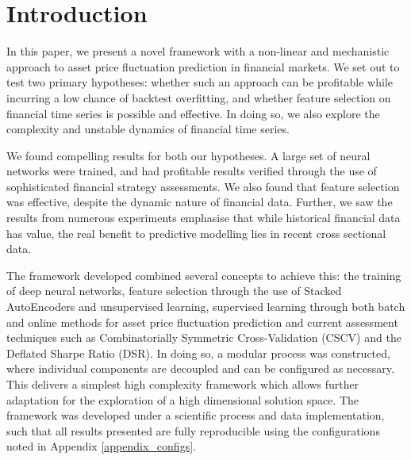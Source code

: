 \documentclass[a4paper,11pt,oneside]{article}
\theoremstyle{plain}
\theoremstyle{definition}
\begin{document}
	\newpage
	
	
	\section{Introduction}\label{Introduction}
	
	
	In this paper, we present a novel framework with a non-linear and mechanistic approach to asset price fluctuation prediction in financial markets. We set out to test two primary hypotheses: whether such an approach can be profitable while incurring a low chance of backtest overfitting, and whether feature selection on financial time series is possible and effective. In doing so, we also explore the complexity and unstable dynamics of financial time series.\newline
	
	We found compelling results for both our hypotheses. A large set of neural networks were trained, and had profitable results verified through the use of sophisticated financial strategy assessments. We also found  that feature selection was effective, despite the dynamic nature of financial data. Further, we saw the results from numerous experiments emphasise that while historical financial data has value, the real benefit to predictive modelling lies in recent cross sectional data.\newline

	The framework developed combined several concepts to achieve this: the training of deep neural networks, feature selection through the use of Stacked AutoEncoders and unsupervised learning, supervised learning through both batch and online methods for asset price fluctuation prediction and current assessment techniques such as Combinatorially Symmetric Cross-Validation (CSCV) and the Deflated Sharpe Ratio (DSR). In doing so, a modular process was constructed, where individual components are decoupled and can be configured as necessary. This delivers a simplest high complexity framework which allows further adaptation for the exploration of a high dimensional solution space. The framework was developed under a scientific process and data implementation, such that all results presented are fully reproducible using the configurations noted in Appendix \ref{appendix_configs}.\newline
\end{document}
